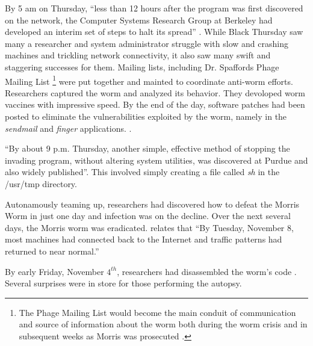By 5 am on Thursday, ``less than 12 hours after the program was first discovered on the network, the Computer Systems Research Group at Berkeley had
developed an interim set of steps to halt its spread''
\cite{spafford_crisis_1989}. While Black Thursday saw many a researcher and
system administrator struggle with slow and crashing machines and trickling
network connectivity, it also saw many swift and staggering successes for them.
Mailing lists, including Dr. Spaffords Phage Mailing List
\footnote{
The Phage Mailing List would become the main conduit of communication and source
of information about the worm both during the worm crisis and in subsequent weeks as Morris
was prosecuted
\cite{spafford_crisis_1989}\cite{spafford_internet_1989-1}\cite{lee_washpost_2013}.
} 
were put together and mainted to coordinate anti-worm efforts.
Researchers captured the worm and analyzed its behavior. They devoloped worm
vaccines with impressive speed. By the end of the day, software patches had been posted to
eliminate the vulnerabilities exploited by the worm, namely in the 
\textit{sendmail} and \textit{finger} applications.
\cite{spafford_crisis_1989}
\cite{seeley_tour_1989}.

``By about 9 p.m. Thursday, another simple, effective method of stopping the
invading program, without altering system utilities, was discovered at Purdue
and also widely published''\cite{spafford_internet_1989-1}. This involved simply
creating a file called \textit{sh} in the /usr/tmp directory.

Autonamously teaming up, researchers had discovered how to defeat the Morris
Worm in just one day and infection was on the decline. Over the next several
days, the Morris worm was eradicated. \cite{spafford_internet_1989-1} relates
that ``By Tuesday, November 8, most machines had connected back to the Internet
and traffic patterns had returned to near normal.''

By early Friday, November $4^{th}$, researchers had disassembled the worm's
code 
\cite{spafford_crisis_1989}
\cite{seeley_tour_1989}.
Several surprises were in store for those performing the autopsy.